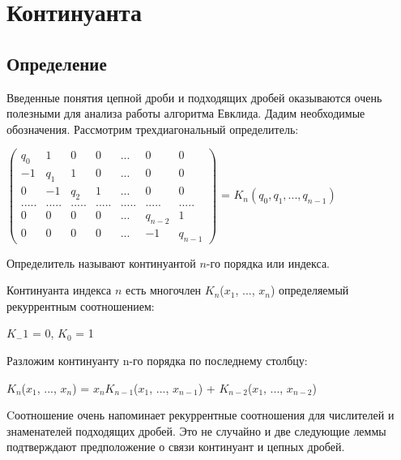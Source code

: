 \documentclass[12pt]{article}
\begin{document}
\section{Континуанта}
\subsection{Определение}
Введенные понятия цепной дроби и подходящих дробей оказываются
очень полезными для анализа работы алгоритма Евклида. Дадим необходимые обозначения. Рассмотрим трехдиагональный определитель:\par
$\begin{pmatrix}
        q_0   & 1     & 0     & 0     & ...   & 0       & 0       \\
        -1    & q_1   & 1     & 0     & ...   & 0       & 0       \\
        0     & -1    & q_2   & 1     & ...   & 0       & 0       \\
        ..... & ..... & ..... & ..... & ..... & .....   & .....   \\
        0     & 0     & 0     & 0     & ...   & q_{n-2} & 1       \\
        0     & 0     & 0     & 0     & ...   & -1      & q_{n-1}
    \end{pmatrix}$
= $K_n(q_0, q_1, ..., q_{n-1})$

Определитель называют континуантой $n$-го порядка или индекса.


Континуанта индекса $n$ есть многочлен $K_n$($x_1$, ..., $x_n$) определяемый рекуррентным соотношением:

$K_-1$ = 0,   $K_0$ = 1\par
Разложим континуанту n-го порядка по последнему столбцу:\par
$K_n$($x_1$, ..., $x_n$) = $x_n K_{n-1}$($x_1$, ..., $x_{n-1}$) + $K_{n-2}$($x_1$, ..., $x_{n-2}$)\par
Cоотношение очень напоминает рекуррентные соотношения для числителей и знаменателей подходящих дробей. Это не случайно и две следующие леммы подтверждают предположение о связи континуант и цепных дробей.
\end{document}
